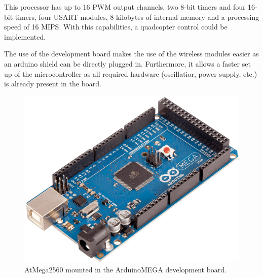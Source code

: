 This processor has up to 16 PWM output channels, two 8-bit timers and four 16-bit timers, four USART modules, 8 kilobytes of internal memory and a processing speed of 16 MIPS. With this capabilities, a quadcopter control could be implemented.

The use of the development board makes the use of the wireless modules easier as an arduino shield can be directly plugged in. Furthermore, it allows a faster set up of the microcontroller as all required hardware (oscillatior, power supply, etc.) is already present in the board. 
\begin{figure}[H]
	\centering
	\includegraphics[scale=0.17]{figures/ARDUINO_MEGA}
	\caption{AtMega2560 mounted in the ArduinoMEGA development board.}
	\label{fig:ATmega}
\end{figure}
